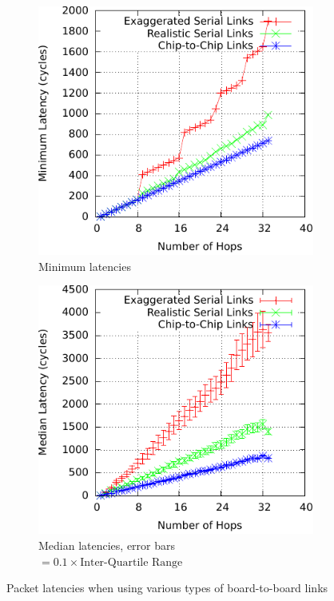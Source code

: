 				\begin{figure}
					\centering
					
					\begin{subfigure}[t]{0.45\textwidth}
						\centering
						\includegraphics[width=\textwidth]{figures/min-time-for-hops}
						\caption{Minimum latencies}
						\label{fig:min-time-for-hops}
					\end{subfigure}
					\begin{subfigure}[t]{0.45\textwidth}
						\centering
						\includegraphics[width=\textwidth]{figures/median-time-for-hops-with-errbars}
						\caption{Median latencies, error bars $=
						0.1\times\textrm{Inter-Quartile Range}$}
						\label{fig:median-time-for-hops-with-errbars}
					\end{subfigure}
					
					
					\caption{Packet latencies when using various types of board-to-board links}
					\label{fig:time-for-hops}
				\end{figure}
				
